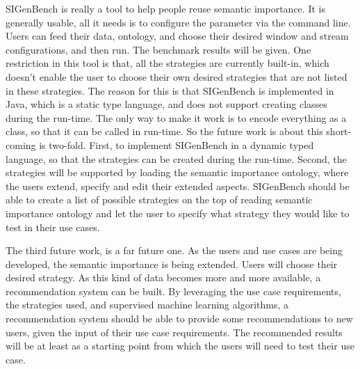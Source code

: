 SIGenBench is really a tool to help people reuse semantic importance.
It is generally usable, all it needs is to configure the parameter via the command line. 
Users can feed their data, ontology, and choose their desired window and stream configurations, and then run. 
The benchmark results will be given.
One restriction in this tool is that, all the strategies are currently built-in, which doesn't enable the user to choose their own desired strategies that are not listed in these strategies. 
The reason for this is that SIGenBench is implemented in Java, which is a static type language, and does not support creating classes during the run-time. 
The only way to make it work is to encode everything as a class, so that it can be called in run-time. 
So the future work is about this short-coming is two-fold.
First, to implement SIGenBench in a dynamic typed language, so that the strategies can be created during the run-time.
Second, the strategies will be supported by loading the semantic importance ontology, where the users extend, specify and edit their extended aspects.
SIGenBench should be able to create a list of possible strategies on the top of reading semantic importance ontology and let the user to specify what strategy they would like to test in their use cases. 

The third future work, is a far future one. 
As the users and use cases are being developed, the semantic importance is being extended. 
Users will choose their desired strategy. 
As this kind of data becomes more and more available, a recommendation system can be built. 
By leveraging the use case requirements, the strategies used, and supervised machine learning algorithms, a recommendation system should be able to provide some recommendations to new users, given the input of their use case requirements. 
The recommended results will be at least as a starting point from which the users will need to test their use case. 